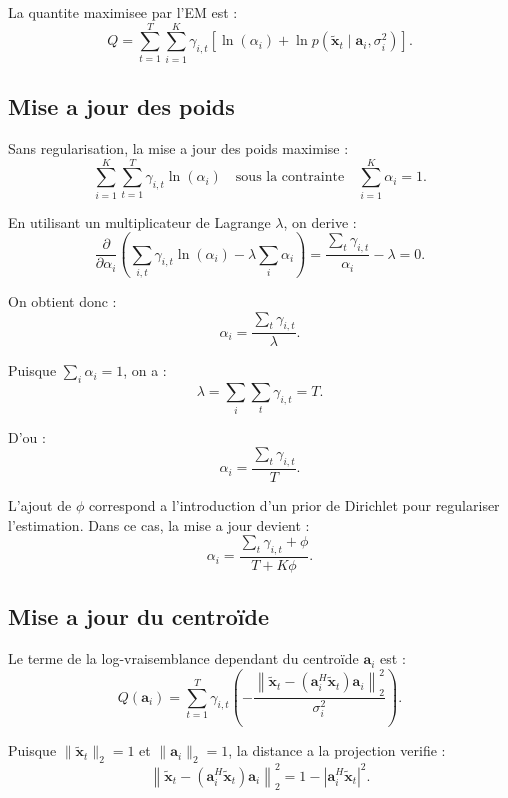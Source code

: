 \documentclass[11pt,a4paper]{article}
\begin{document}
La quantite maximisee par l'EM est :
\[
  Q
    =
    \sum_{t=1}^{T}
    \sum_{i=1}^{K}
    \gamma_{i,t}
    \left[
      \ln(\alpha_i)
      +
      \ln p\left(
        \tilde{\mathbf{x}}_t
        \mid
        \mathbf{a}_i,\sigma_i^2
      \right)
    \right].
\]

\subsection{Mise a jour des poids}

Sans regularisation, la mise a jour des poids maximise :
\[
  \sum_{i=1}^{K}
  \sum_{t=1}^{T}
  \gamma_{i,t}\ln(\alpha_i)
  \quad
  \text{sous la contrainte}
  \quad
  \sum_{i=1}^{K}\alpha_i=1.
\]

En utilisant un multiplicateur de Lagrange $\lambda$, on derive :
\[
  \frac{\partial}{\partial \alpha_i}
  \left(
    \sum_{i,t}\gamma_{i,t}\ln(\alpha_i)
    -
    \lambda\sum_i\alpha_i
  \right)
  =
  \frac{\sum_t\gamma_{i,t}}{\alpha_i}
  -
  \lambda
  =
  0.
\]

On obtient donc :
\[
  \alpha_i
    =
    \frac{\sum_t\gamma_{i,t}}{\lambda}.
\]

Puisque $\sum_i\alpha_i=1$, on a :
\[
  \lambda
    =
    \sum_i\sum_t\gamma_{i,t}
    =
    T.
\]

D'ou :
\[
  \alpha_i
    =
    \frac{\sum_t\gamma_{i,t}}{T}.
\]

L'ajout de $\phi$ correspond a l'introduction d'un prior de Dirichlet pour
regulariser l'estimation. Dans ce cas, la mise a jour devient :
\[
  \alpha_i
    =
    \frac{\sum_t\gamma_{i,t}+\phi}
         {T+K\phi}.
\]

\subsection{Mise a jour du centroïde}

Le terme de la log-vraisemblance dependant du centroïde $\mathbf{a}_i$ est :
\[
  Q(\mathbf{a}_i)
    =
    \sum_{t=1}^{T}
    \gamma_{i,t}
    \left(
      -
      \frac{
        \left\|
          \tilde{\mathbf{x}}_t
          -
          \left(\mathbf{a}_i^{H}\tilde{\mathbf{x}}_t\right)\mathbf{a}_i
        \right\|_2^2
      }
      {\sigma_i^2}
    \right).
\]

Puisque $\|\tilde{\mathbf{x}}_t\|_2=1$ et $\|\mathbf{a}_i\|_2=1$, la distance a
la projection verifie :
\[
  \left\|
    \tilde{\mathbf{x}}_t
    -
    \left(\mathbf{a}_i^{H}\tilde{\mathbf{x}}_t\right)\mathbf{a}_i
  \right\|_2^2
  =
  1
  -
  \left|
    \mathbf{a}_i^{H}\tilde{\mathbf{x}}_t
  \right|^2.
\]
\end{document}
